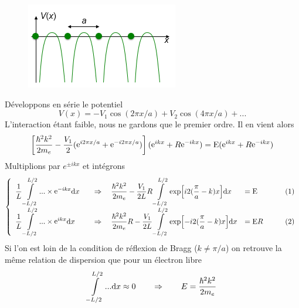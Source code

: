 	\begin{figure}
	\vspace{-5mm}
	\includegraphics[scale=0.6]{ch5/image4}
	\end{figure}
	Développons en série le potentiel
	\begin{equation}
	V(x) =  - {V_1}\cos (2\pi x/a) + {V_2}\cos (4\pi x/a) + ...
	\end{equation}
	L'interaction étant faible, nous ne gardons que le premier ordre. Il en vient alors
	\begin{equation}
	\left[ {\frac{{{\hbar ^2}{k^2}}}{{2{m_e}}} - \frac{{{V_1}}}{2}({{\mathop{\rm e}\nolimits} ^{i2\pi x/a}} + {{\mathop{\rm e}\nolimits} ^{ - i2\pi x/a}})} \right]({{\mathop{\rm e}\nolimits} ^{ikx}} + R{{\mathop{\rm e}\nolimits} ^{ - ikx}}) = {\rm{E}}({{\mathop{\rm e}\nolimits} ^{ikx}} + R{{\mathop{\rm e}\nolimits} ^{ - ikx}})
	\end{equation}
	Multiplions par $e^{\pm ikx}$ et intégrons
	\begin{equation}
	\left\{\begin{array}{llll}
	\displaystyle \frac{1}{L}\int\limits_{ - L/2}^{L/2} {... \times {{\mathop{\rm e}\nolimits} ^{ - ikx}}{\rm{d}}x} &\displaystyle\quad\Rightarrow\quad \frac{{{\hbar ^2}{k^2}}}{{2{m_e}}} - \frac{{{V_1}}}{{2L}}R\int\limits_{ - L/2}^{L/2} {\exp [i2(\frac{\pi }{a} - k)x]{\rm{d}}x}  &\displaystyle= {\rm{E}}&\qquad(1)\\
	\displaystyle\frac{1}{L}\int\limits_{ - L/2}^{L/2} {... \times {{\mathop{\rm e}\nolimits} ^{ikx}}{\rm{d}}x}&
	\displaystyle\quad\Rightarrow\quad \frac{{{\hbar ^2}{k^2}}}{{2{m_e}}}R - \frac{{{V_1}}}{{2L}}\int\limits_{ - L/2}^{L/2} {\exp [ - i2(\frac{\pi }{a} - k)x]{\rm{d}}x}  &\displaystyle= {\rm{E}}R&\qquad(2)
	\end{array}\right.
	\end{equation}
	Si l'on est loin de la condition de réflexion de Bragg ($k\neq \pi/a$) on retrouve la même 
	relation de dispersion que pour un électron libre
	\begin{equation}
	\int\limits_{ - L/2}^{L/2} {...{\rm{d}}x}  \approx 0\qquad\Rightarrow\qquad E = \frac{{{\hbar ^2}
	{k^2}}}{{2{m_e}}}
	\end{equation}
